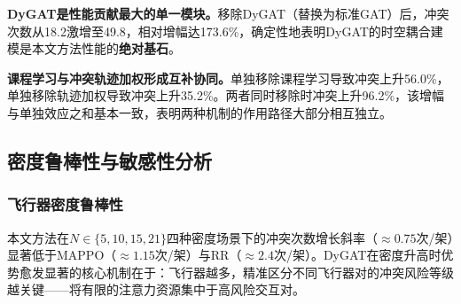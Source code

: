 \documentclass[12pt,a4paper,UTF8]{ctexart}
\begin{document}
\begin{table}[H]
    \centering
    \caption{消融实验结果（21架eVTOL，5次独立测试，均值$\pm$标准差）}
    \label{tab:ablation}
\end{table}

\textbf{DyGAT是性能贡献最大的单一模块。}移除DyGAT（替换为标准GAT）后，冲突次数从18.2激增至49.8，相对增幅达173.6\%，确定性地表明DyGAT的时空耦合建模是本文方法性能的\textbf{绝对基石}。

\textbf{课程学习与冲突轨迹加权形成互补协同。}单独移除课程学习导致冲突上升56.0\%，单独移除轨迹加权导致冲突上升35.2\%。两者同时移除时冲突上升96.2\%，该增幅与单独效应之和基本一致，表明两种机制的作用路径大部分相互独立。

\subsection{密度鲁棒性与敏感性分析}

\subsubsection{飞行器密度鲁棒性}

本文方法在$N \in \{5, 10, 15, 21\}$四种密度场景下的冲突次数增长斜率（$\approx 0.75$次/架）显著低于MAPPO（$\approx 1.15$次/架）与RR（$\approx 2.4$次/架）。DyGAT在密度升高时优势愈发显著的核心机制在于：飞行器越多，精准区分不同飞行器对的冲突风险等级越关键——将有限的注意力资源集中于高风险交互对。
\end{document}
